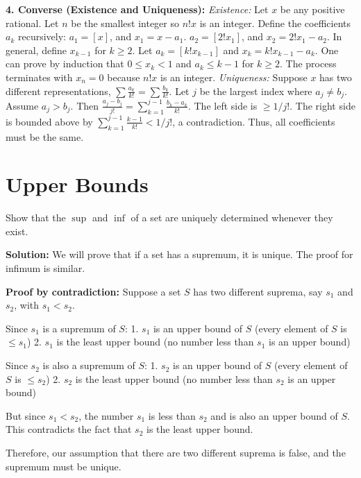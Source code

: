 \textbf{4. Converse (Existence and Uniqueness):}
\textit{Existence:} Let $x$ be any positive rational. Let $n$ be the smallest integer so $n!x$ is an integer. Define the coefficients $a_k$ recursively:
$a_1 = [x]$, and $x_1 = x - a_1$.
$a_2 = [2!x_1]$, and $x_2 = 2!x_1 - a_2$.
In general, define $x_{k-1}$ for $k \ge 2$. Let $a_k = [k!x_{k-1}]$ and $x_k = k!x_{k-1} - a_k$.
One can prove by induction that $0 \le x_k < 1$ and $a_k \le k-1$ for $k \ge 2$. The process terminates with $x_n=0$ because $n!x$ is an integer.
\textit{Uniqueness:} Suppose $x$ has two different representations, $\sum \frac{a_k}{k!} = \sum \frac{b_k}{k!}$. Let $j$ be the largest index where $a_j \neq b_j$. Assume $a_j > b_j$. Then $\frac{a_j - b_j}{j!} = \sum_{k=1}^{j-1} \frac{b_k - a_k}{k!}$. The left side is $\ge 1/j!$. The right side is bounded above by $\sum_{k=1}^{j-1} \frac{k-1}{k!} < 1/j!$, a contradiction. Thus, all coefficients must be the same.


\section{Upper Bounds}

\begin{problembox}
Show that the $\sup$ and $\inf$ of a set are uniquely determined whenever they exist.
\end{problembox}

\textbf{Solution:}
We will prove that if a set has a supremum, it is unique. The proof for infimum is similar.

\textbf{Proof by contradiction:}
Suppose a set $S$ has two different suprema, say $s_1$ and $s_2$, with $s_1 < s_2$.

Since $s_1$ is a supremum of $S$:
1. $s_1$ is an upper bound of $S$ (every element of $S$ is $\leq s_1$)
2. $s_1$ is the least upper bound (no number less than $s_1$ is an upper bound)

Since $s_2$ is also a supremum of $S$:
1. $s_2$ is an upper bound of $S$ (every element of $S$ is $\leq s_2$)
2. $s_2$ is the least upper bound (no number less than $s_2$ is an upper bound)

But since $s_1 < s_2$, the number $s_1$ is less than $s_2$ and is also an upper bound of $S$. This contradicts the fact that $s_2$ is the least upper bound.

Therefore, our assumption that there are two different suprema is false, and the supremum must be unique.

